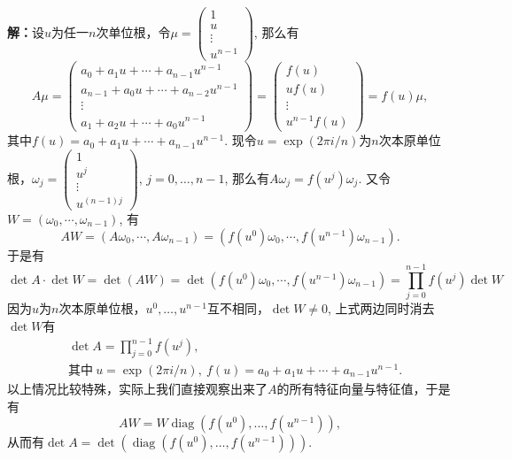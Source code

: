 {\bf 解：}设$u$为任一$n$次单位根，令$\mu = \begin{pmatrix} 1 \\ u \\ \vdots \\ u^{n-1} \end{pmatrix}$, 那么有
$$A\mu = \begin{pmatrix} a_0 + a_1u + \cdots + a_{n-1}u^{n-1} \\ a_{n-1} + a_0u + \cdots + a_{n-2}u^{n-1} \\ \vdots \\ a_1 + a_2u + \cdots + a_0u^{n-1} \end{pmatrix} = \begin{pmatrix} f(u) \\ uf(u) \\ \vdots \\ u^{n-1}f(u) \end{pmatrix} = f(u)\mu,$$
其中$f(u) = a_0 + a_1u + \cdots + a_{n-1}u^{n-1}$. 现令$u = \exp(2\pi i/n)$为$n$次本原单位根，$\omega_j = \begin{pmatrix} 1 \\ u^j \\ \vdots \\ u^{(n-1)j} \end{pmatrix}$, $j=0,\ldots,n-1$, 那么有$A\omega_j = f(u^j)\omega_j$. 又令$W = (\omega_0, \cdots, \omega_{n-1})$, 有
$$AW = (A\omega_0, \cdots, A\omega_{n-1}) = (f(u^0)\omega_0, \cdots, f(u^{n-1})\omega_{n-1}).$$
于是有
$$\det A \cdot \det W = \det(AW) = \det(f(u^0)\omega_0, \cdots, f(u^{n-1})\omega_{n-1}) = \prod_{j=0}^{n-1}f(u^j) \det W$$
因为$u$为$n$次本原单位根，$u^0, \ldots, u^{n-1}$互不相同，$\det W \neq 0$, 上式两边同时消去$\det W$有
\begin{align*}
& \det A = \prod_{j=0}^{n-1}f(u^j), \\
& \text{其中}\  u = \exp(2\pi i/n), \ f(u) = a_0 + a_1u + \cdots + a_{n-1}u^{n-1}.
\end{align*}
以上情况比较特殊，实际上我们直接观察出来了$A$的所有特征向量与特征值，于是有
$$AW = W\operatorname{diag}(f(u^0), \ldots, f(u^{n-1})),$$
从而有$\det A = \det(\operatorname{diag}(f(u^0), \ldots, f(u^{n-1})))$.

\fi  %


